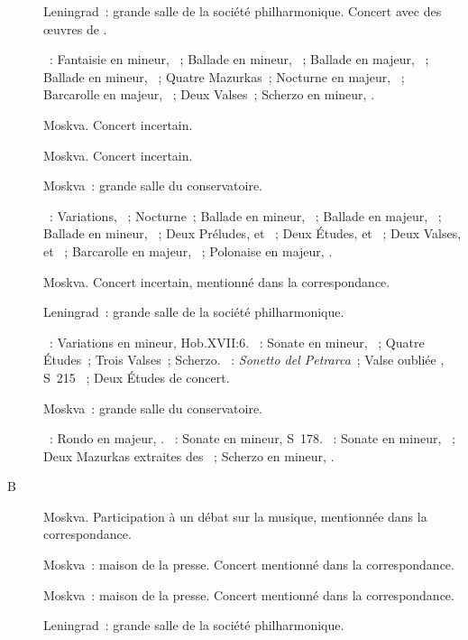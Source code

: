 \begin{description}
 \item[]
 Leningrad~: grande salle de la société philharmonique.
 Concert avec des œuvres de \Chopin{}.

 \textsc{\Chopin{}}~: Fantaisie en \kF mineur, ~; Ballade en \kF
 mineur, ~; Ballade en \kA \Flat majeur, ~; Ballade en \kG
 mineur, ~; Quatre Mazurkas~; Nocturne en \kF \Sharp majeur,
  ~; Barcarolle en \kF \Sharp majeur, ~; Deux
 Valses~; Scherzo en \kB mineur, .
 \item[]
 Moskva.
 Concert incertain.
 \item[]
 Moskva.
 Concert incertain.
 \item[]
 Moskva~: grande salle du conservatoire.

 \textsc{\Chopin{}}~: Variations, ~; Nocturne~; Ballade en \kG
 mineur, ~; Ballade en \kA \Flat majeur, ~; Ballade en \kF
 mineur, ~; Deux Préludes,   et ~;
 Deux Études,   et  ~; Deux Valses,
   et  ~; Barcarolle en \kF \Sharp
 majeur, ~; Polonaise en \kA \Flat majeur, .
 \item[]
 Moskva.
 Concert incertain, mentionné dans la correspondance.
 \item[]
 Leningrad~: grande salle de la société philharmonique.

 \textsc{\Haydn{}}~: Variations en \kF mineur, Hob.XVII:6.
 \textsc{\Chopin{}}~: Sonate en \kB \Flat mineur, ~; Quatre
 Études~; Trois Valses~; Scherzo.
 \textsc{\Liszt{}}~: \emph{Sonetto del Petrarca}~; Valse oubliée ,
 S~215 ~; Deux Études de concert.
 \item[]
 Moskva~: grande salle du conservatoire.

 \textsc{\Beethoven{}}~: Rondo en \kG majeur,  .
 \textsc{\Liszt{}}~: Sonate en \kB mineur, S~178.
 \textsc{\Chopin{}}~: Sonate en \kB \Flat mineur, ~; Deux Mazurkas
 extraites des ~; Scherzo en \kB \Flat mineur, .
 \item[B]
 Moskva.
 Participation à un débat sur la musique, mentionnée dans la correspondance.
 \item[]
 Moskva~: maison de la presse.
 Concert mentionné dans la correspondance.
 \item[]
 Moskva~: maison de la presse.
 Concert mentionné dans la correspondance.
 \item[]
 Leningrad~: grande salle de la société philharmonique.


\end{description}
